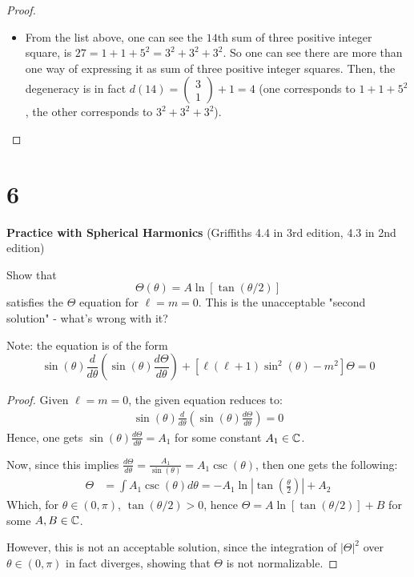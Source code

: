 \documentclass{article}
\begin{document}
\begin{proof}
\begin{itemize}
    \hfil

    \item[(c)] From the list above, one can see the $14$th sum of three positive integer square, is $27 = 1+1+5^2=3^2+3^2+3^2$. So one can see there are more than one way of expressing it as sum of three positive integer squares. Then, the degeneracy is in fact $d(14) = \begin{pmatrix}
        3\\1
    \end{pmatrix} + 1 = 4$ (one corresponds to $1+1+5^2$, the other corresponds to $3^2+3^2+3^2$).
    \end{itemize}
\end{proof}

\newpage

\section*{6}

\begin{ques}\label{q6}
\textbf{Practice with Spherical Harmonics} (Griffiths 4.4 in 3rd edition, 4.3 in 2nd edition)

Show that 
$$\Theta(\theta) = A \ln[\tan(\theta/2)]$$
satisfies the $\Theta$ equation for $\ell=m=0$. This is the unacceptable "second solution" - what's wrong with it?

Note: the equation is of the form 
$$\sin(\theta)\frac{d}{d\theta}\left(\sin(\theta)\frac{d\Theta}{d\theta}\right)+[\ell(\ell+1)\sin^2(\theta)-m^2]\Theta = 0$$
\end{ques}

\begin{proof}
    Given $\ell=m=0$, the given equation reduces to:
    \begin{align}
        \sin(\theta)\frac{d}{d\theta}\left(\sin(\theta)\frac{d\Theta}{d\theta}\right)=0
    \end{align}
    Hence, one gets $\sin(\theta)\frac{d\Theta}{d\theta} = A_1$ for some constant $A_1 \in \mathbb{C}$.

    Now, since this implies $\frac{d\Theta}{d\theta} = \frac{A_1}{\sin(\theta)} = A_1 \csc(\theta)$, then one gets the following:
    \begin{align}
        \Theta &= \int A_1 \csc(\theta) d\theta = -A_1 \ln\left|\tan\left(\frac{\theta}{2}\right)\right|+A_2
    \end{align}
    Which, for $\theta\in (0,\pi)$, $\tan(\theta/2)>0$, hence $\Theta = A \ln[\tan(\theta/2)]+B$ for some $A,B \in \mathbb{C}$.

    However, this is not an acceptable solution, since the integration of $|\Theta|^2$ over $\theta\in (0,\pi)$ in fact diverges, showing that $\Theta$ is not normalizable.
\end{proof}
\end{document}

